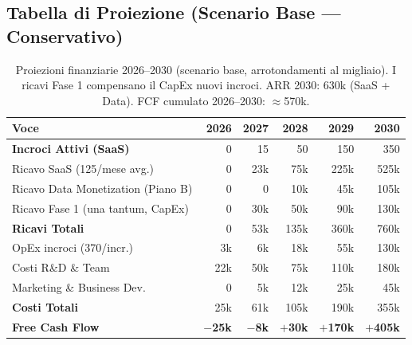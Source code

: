 \documentclass[a4paper,11pt]{article}
\begin{document}
\subsection{Tabella di Proiezione (Scenario Base --- Conservativo)}

\begin{table}[h!]
\centering
\renewcommand{\arraystretch}{1.5}
\begin{tabular}{l r r r r r}
\toprule
\textbf{Voce} & \textbf{2026} & \textbf{2027} & \textbf{2028} & \textbf{2029} & \textbf{2030} \\
\midrule
\textbf{Incroci Attivi (SaaS)}        & 0          & 15         & 50          & 150         & 350         \\
\midrule
Ricavo SaaS (\texteuro{}125/mese avg.)  & \texteuro{}0 & \texteuro{}23k & \texteuro{}75k & \texteuro{}225k & \texteuro{}525k \\
Ricavo Data Monetization (Piano B)    & \texteuro{}0 & \texteuro{}0   & \texteuro{}10k & \texteuro{}45k  & \texteuro{}105k \\
Ricavo Fase 1 (una tantum, CapEx)     & \texteuro{}0 & \texteuro{}30k & \texteuro{}50k & \texteuro{}90k  & \texteuro{}130k \\
\midrule
\textbf{Ricavi Totali}                & \texteuro{}0   & \texteuro{}53k & \texteuro{}135k & \texteuro{}360k & \texteuro{}760k \\
\midrule
OpEx incroci (\texteuro{}370/incr.)   & \texteuro{}3k  & \texteuro{}6k  & \texteuro{}18k  & \texteuro{}55k  & \texteuro{}130k \\
Costi R\&D \& Team                    & \texteuro{}22k & \texteuro{}50k & \texteuro{}75k  & \texteuro{}110k & \texteuro{}180k \\
Marketing \& Business Dev.            & \texteuro{}0   & \texteuro{}5k  & \texteuro{}12k  & \texteuro{}25k  & \texteuro{}45k  \\
\midrule
\textbf{Costi Totali}                 & \texteuro{}25k & \texteuro{}61k & \texteuro{}105k & \texteuro{}190k & \texteuro{}355k \\
\midrule
\textbf{Free Cash Flow}               &
    \textcolor{SmartRed}{\textbf{$-$\texteuro{}25k}} &
    \textcolor{SmartRed}{\textbf{$-$\texteuro{}8k}} &
    \textcolor{SmartGreen}{\textbf{$+$\texteuro{}30k}} &
    \textcolor{SmartGreen}{\textbf{$+$\texteuro{}170k}} &
    \textcolor{SmartGreen}{\textbf{$+$\texteuro{}405k}} \\
\bottomrule
\end{tabular}
\caption{Proiezioni finanziarie 2026--2030 (scenario base, arrotondamenti al migliaio). I ricavi Fase 1 compensano il CapEx nuovi incroci. ARR 2030: \texteuro{}630k (SaaS + Data). FCF cumulato 2026--2030: $\approx$\texteuro{}570k.}
\end{table}
\end{document}
